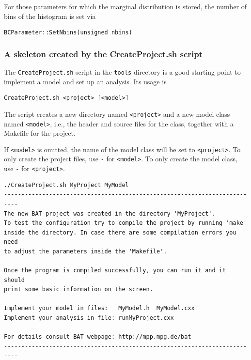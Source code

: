 \documentclass[11pt, a4paper]{article}
\begin{document}
For those parameters for which the marginal distribution is stored,
the number of bins of the histogram is set via
\begin{verbatim}
BCParameter::SetNbins(unsigned nbins)
\end{verbatim}



\subsubsection{A skeleton created by the CreateProject.sh script}
\label{subsubsection:createproject}

The \verb|CreateProject.sh| script in the \verb|tools| directory is a
good starting point to implement a model and set up an analysis. Its
usage is
%
\begin{verbatim}
CreateProject.sh <project> [<model>]
\end{verbatim}

The script creates a new directory named \verb|<project>| and a new
model class named \verb|<model>|, i.e., the header and source files
for the class, together with a Makefile for the project.

If \verb|<model>| is omitted, the name of the model class will be set
to \verb|<project>|.  To only create the project files, use \verb|-|
for \verb|<model>|.  To only create the model class, use \verb|-| for
\verb|<project>|.

\begin{verbatim}
./CreateProject.sh MyProject MyModel
--------------------------------------------------------------------------
The new BAT project was created in the directory 'MyProject'.
To test the configuration try to compile the project by running 'make'
inside the directory. In case there are some compilation errors you need
to adjust the parameters inside the 'Makefile'.

Once the program is compiled successfully, you can run it and it should
print some basic information on the screen.

Implement your model in files:   MyModel.h  MyModel.cxx
Implement your analysis in file: runMyProject.cxx

For details consult BAT webpage: http://mpp.mpg.de/bat
--------------------------------------------------------------------------
\end{verbatim}
\end{document}
